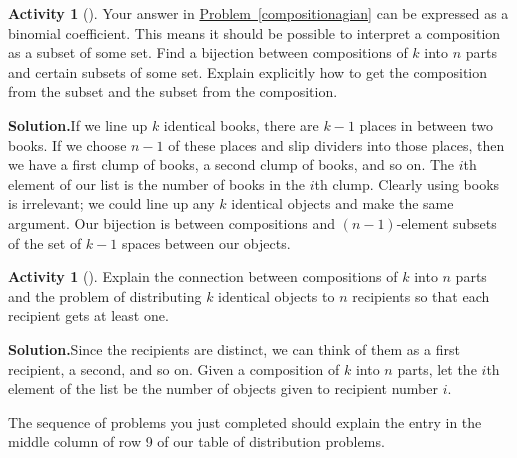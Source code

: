 \documentclass[10pt,]{book}
\theoremstyle{plain}
\theoremstyle{definition}
\newtheorem{activity}[project]{Activity}
\numberwithin{equation}{chapter}
\begin{document}
\begin{activity}[]\label{activity-116}
Your answer in \hyperref[compositionagian]{Problem~\ref{compositionagian}} can be expressed as a binomial coefficient. This means it should be possible to interpret a composition as a subset of some set. Find a bijection between compositions of \(k\) into \(n\) parts and certain subsets of some set.  Explain explicitly how to get the composition from the subset and the subset from the composition.%
\par\medskip\noindent%
\textbf{Solution.}\quad If we line up \(k\) identical books, there are \(k-1\) places in between two books. If we choose \(n-1\) of these places and slip dividers into those places, then we have a first clump of books, a second clump of books, and so on. The \(i\)th element of our list is the number of books in the \(i\)th clump. Clearly using books is irrelevant; we could line up any \(k\) identical objects and make the same argument. Our bijection is between compositions and \((n-1)\)-element subsets of the set of \(k-1\) spaces between our objects.%
\end{activity}
\begin{activity}[]\label{activity-117}
Explain the connection between compositions of \(k\) into \(n\) parts and the problem of distributing \(k\) identical objects to \(n\) recipients so that each recipient gets at least one.%
\par\medskip\noindent%
\textbf{Solution.}\quad Since the recipients are distinct, we can think of them as a first recipient, a second, and so on. Given a composition of \(k\) into \(n\) parts, let the \(i\)th element of the list be the number of objects given to recipient number \(i\).%
\end{activity}
The sequence of problems you just completed should explain the entry in the middle column of row 9 of our table of distribution problems.%
\typeout{************************************************}
\typeout{************************************************}
\end{document}
